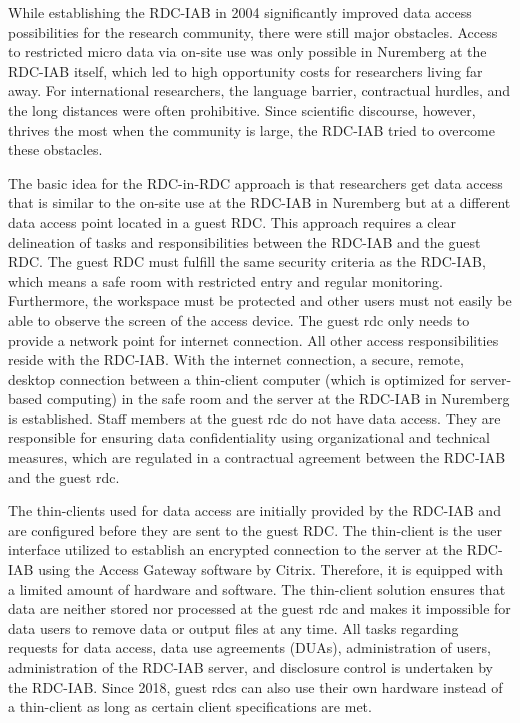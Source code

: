 While establishing the RDC-IAB in 2004 significantly improved data access possibilities for the research community, there were still major obstacles. Access to restricted micro data via on-site use was only possible in Nuremberg at the RDC-IAB itself, which led to high opportunity costs for researchers living far away. For international researchers, the language barrier, contractual hurdles, and the long distances were often prohibitive. Since scientific discourse, however, thrives the most when the community is large, the RDC-IAB tried to overcome these obstacles.

The basic idea for the RDC-in-RDC approach is that researchers get data access that is similar to the on-site use at the RDC-IAB in Nuremberg but at a different data access point located in a guest RDC. This approach requires a clear delineation of tasks and responsibilities between the RDC-IAB and the guest RDC. The guest RDC must fulfill the same security criteria as the RDC-IAB, which means a safe room with restricted entry and regular monitoring. Furthermore, the workspace must be protected and other users must not easily be able to observe the screen of the access device. The guest rdc only needs to provide a network point for internet connection. All other access responsibilities reside with the RDC-IAB. With the internet connection, a secure, remote, desktop connection between a thin-client computer (which is optimized for server-based computing) in the safe room and the server at the RDC-IAB in Nuremberg is established. Staff members at the guest rdc do not have data access. They are responsible for ensuring data confidentiality using organizational and technical measures, which are regulated in a contractual agreement between the RDC-IAB and the guest rdc.

The thin-clients used for data access are initially provided by the RDC-IAB and are configured before they are sent to the guest RDC. The thin-client is the user interface utilized to establish an encrypted connection to the server at the RDC-IAB using the Access Gateway software by Citrix. Therefore, it is equipped with a limited amount of hardware and software. The thin-client solution ensures that data are neither stored nor processed at the guest rdc and makes it impossible for data users to remove data or output files at any time. All tasks regarding requests for data access, data use agreements (DUAs), administration of users, administration of the RDC-IAB server, and disclosure control is undertaken by the RDC-IAB. Since 2018, guest rdcs can also use their own hardware instead of a thin-client as long as certain client specifications are met.

